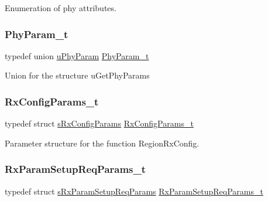 Enumeration of phy attributes. \mbox{\label{group___r_e_g_i_o_n_gaed159b26e5c4677236b6e8677019db30}} 
\subsubsection{\texorpdfstring{Phy\+Param\+\_\+t}{PhyParam\_t}}
{\footnotesize\ttfamily typedef union \mbox{\hyperlink{unionu_phy_param}{u\+Phy\+Param}} \mbox{\hyperlink{group___r_e_g_i_o_n_gaed159b26e5c4677236b6e8677019db30}{Phy\+Param\+\_\+t}}}

Union for the structure u\+Get\+Phy\+Params \mbox{\label{group___r_e_g_i_o_n_ga375c038078dfcfc7ef14280021db719e}} 
\subsubsection{\texorpdfstring{Rx\+Config\+Params\+\_\+t}{RxConfigParams\_t}}
{\footnotesize\ttfamily typedef struct \mbox{\hyperlink{structs_rx_config_params}{s\+Rx\+Config\+Params}} \mbox{\hyperlink{group___r_e_g_i_o_n_ga375c038078dfcfc7ef14280021db719e}{Rx\+Config\+Params\+\_\+t}}}

Parameter structure for the function Region\+Rx\+Config. \mbox{\label{group___r_e_g_i_o_n_ga7165f282c670c728c36d534df2285157}} 
\subsubsection{\texorpdfstring{Rx\+Param\+Setup\+Req\+Params\+\_\+t}{RxParamSetupReqParams\_t}}
{\footnotesize\ttfamily typedef struct \mbox{\hyperlink{structs_rx_param_setup_req_params}{s\+Rx\+Param\+Setup\+Req\+Params}} \mbox{\hyperlink{group___r_e_g_i_o_n_ga7165f282c670c728c36d534df2285157}{Rx\+Param\+Setup\+Req\+Params\+\_\+t}}}

